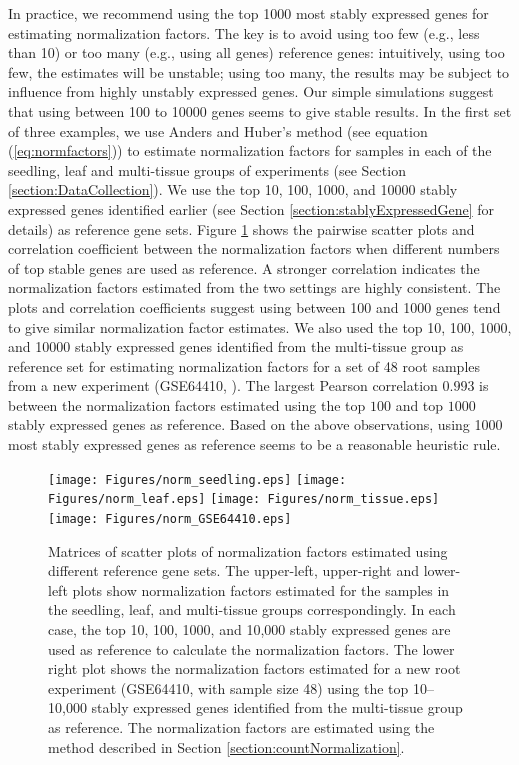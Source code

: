 \documentclass[letterpaper,12pt]{article}
\begin{document}
In practice, we recommend using the top 1000 most stably expressed genes for
estimating normalization factors. The key is to avoid using too few (e.g.,
less than 10) or too many (e.g., using all genes) reference genes:
intuitively, using too few, the estimates will be unstable; using too many,
the results may be subject to influence from highly unstably expressed genes.
Our simple simulations suggest that using between 100 to 10000 genes seems to
give stable results. In the first set of three examples, we use Anders and
Huber's method (see equation (\ref{eq:normfactors})) to estimate normalization
factors for samples in each of the seedling, leaf and multi-tissue groups of
experiments (see Section \ref{section:DataCollection}).  We use the top 10,
100, 1000, and 10000 stably expressed genes identified earlier (see Section
\ref{section:stablyExpressedGene} for details) as reference gene sets. Figure
\ref{fig:normfactor} shows the pairwise scatter plots and correlation
coefficient between the normalization factors when different numbers of top
stable genes are used as reference. A stronger correlation indicates the
normalization factors estimated from the two settings are highly consistent.
The plots and correlation coefficients suggest using between 100 and 1000
genes tend to give similar normalization factor estimates. We also used the
top 10, 100, 1000, and 10000 stably expressed genes identified from the
multi-tissue group as reference set for estimating normalization factors for a set
of 48 root samples from a new experiment (GSE64410, \cite{vragovic2015translatome}). The largest Pearson correlation
$0.993$ is between the normalization factors estimated using the top $100$
and top $1000$ stably expressed genes as reference. Based on the above
observations, using 1000 most stably expressed genes as reference seems to be
a reasonable heuristic rule.




\begin{figure}[!ht]
	\begin{center}
		\texttt{[image: Figures/norm\_seedling.eps]}
		\texttt{[image: Figures/norm\_leaf.eps]}
		\texttt{[image: Figures/norm\_tissue.eps]}
		\texttt{[image: Figures/norm\_GSE64410.eps]}
		\caption{Matrices of scatter plots of normalization factors
		estimated using different reference gene sets. 
		The upper-left, upper-right and lower-left plots show
		normalization factors estimated for the samples in the
		seedling, leaf, and multi-tissue groups correspondingly. 
		In each case, the top 10, 100, 1000, and 10,000 stably
		expressed genes are used as reference to
		calculate the normalization factors.
		The lower right plot shows the normalization factors estimated for a new root
		experiment (GSE64410, with sample size 48) using the top 10--10,000
		stably expressed genes identified from the multi-tissue group as
		reference. The normalization factors are estimated using the
		method described in Section \ref{section:countNormalization}.}
		\label{fig:normfactor} \end{center} \end{figure}
\end{document}
